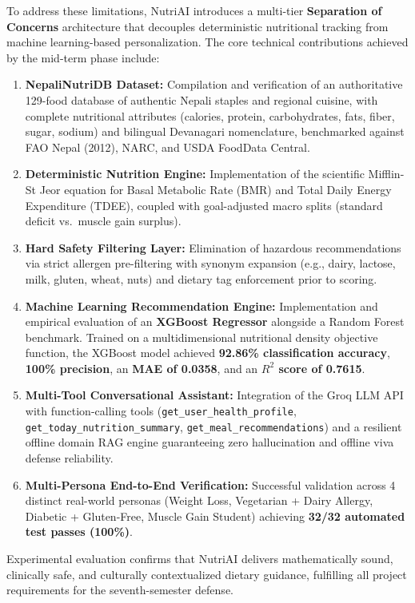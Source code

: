 \documentclass[12pt,a4paper]{report}
\begin{document}
To address these limitations, NutriAI introduces a multi-tier \textbf{Separation of Concerns} architecture that decouples deterministic nutritional tracking from machine learning-based personalization. The core technical contributions achieved by the mid-term phase include:
\begin{enumerate}[leftmargin=*]
  \item \textbf{NepaliNutriDB Dataset:} Compilation and verification of an authoritative 129-food database of authentic Nepali staples and regional cuisine, with complete nutritional attributes (calories, protein, carbohydrates, fats, fiber, sugar, sodium) and bilingual Devanagari nomenclature, benchmarked against FAO Nepal (2012), NARC, and USDA FoodData Central.
  \item \textbf{Deterministic Nutrition Engine:} Implementation of the scientific Mifflin-St Jeor equation for Basal Metabolic Rate (BMR) and Total Daily Energy Expenditure (TDEE), coupled with goal-adjusted macro splits (standard deficit vs.\ muscle gain surplus).
  \item \textbf{Hard Safety Filtering Layer:} Elimination of hazardous recommendations via strict allergen pre-filtering with synonym expansion (e.g., dairy, lactose, milk, gluten, wheat, nuts) and dietary tag enforcement prior to scoring.
  \item \textbf{Machine Learning Recommendation Engine:} Implementation and empirical evaluation of an \textbf{XGBoost Regressor} alongside a Random Forest benchmark. Trained on a multidimensional nutritional density objective function, the XGBoost model achieved \textbf{92.86\% classification accuracy}, \textbf{100\% precision}, an \textbf{MAE of 0.0358}, and an \textbf{$R^2$ score of 0.7615}.
  \item \textbf{Multi-Tool Conversational Assistant:} Integration of the Groq LLM API with function-calling tools (\texttt{get\_user\_health\_profile}, \texttt{get\_today\_nutrition\_summary}, \texttt{get\_meal\_recommendations}) and a resilient offline domain RAG engine guaranteeing zero hallucination and offline viva defense reliability.
  \item \textbf{Multi-Persona End-to-End Verification:} Successful validation across 4 distinct real-world personas (Weight Loss, Vegetarian + Dairy Allergy, Diabetic + Gluten-Free, Muscle Gain Student) achieving \textbf{32/32 automated test passes (100\%)}.
\end{enumerate}

Experimental evaluation confirms that NutriAI delivers mathematically sound, clinically safe, and culturally contextualized dietary guidance, fulfilling all project requirements for the seventh-semester defense.
\end{document}
